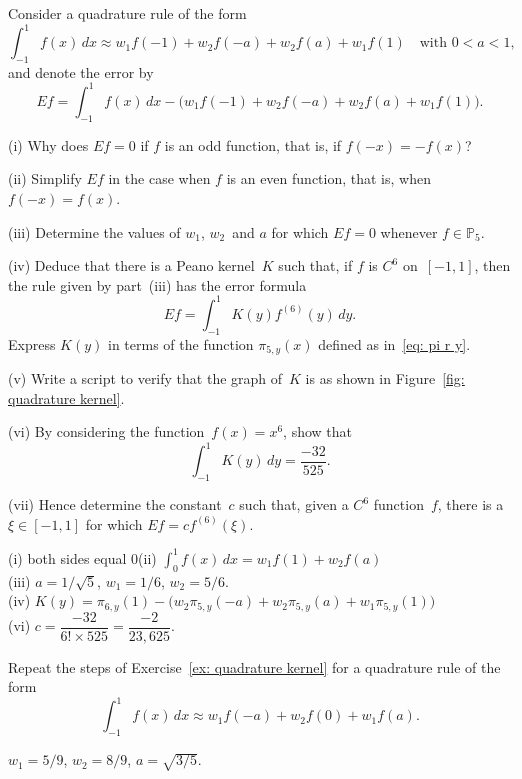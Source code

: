 \begin{Exercises}
\exercise\label{ex: quadrature kernel}
Consider a quadrature rule of the form
\[
\int_{-1}^1f(x)\,dx\approx w_1f(-1)+w_2f(-a)+w_2f(a)+w_1f(1)
\quad\text{with $0<a<1$,}
\]
and denote the error by
\[
Ef=\int_{-1}^1f(x)\,dx-\bigl(w_1f(-1)+w_2f(-a)+w_2f(a)+w_1f(1)\bigr).
\]
\begin{description}
\item{(i)} Why does $Ef=0$ if $f$ is an odd function, that is, if
$f(-x)=-f(x)$?
\item{(ii)} Simplify $Ef$ in the case when $f$ is an even function, that is, 
when $f(-x)=f(x)$. \item{(iii)}
Determine the values of $w_1$, $w_2$~and $a$ for which $Ef=0$ whenever
$f\in\mathbb{P}_5$.
\item{(iv)}
Deduce that there is a Peano kernel~$K$ such that, if $f$ is $C^6$ 
on~$[-1,1]$, then the rule given by part~(iii) has the error formula
\[
Ef=\int_{-1}^1K(y)f^{(6)}(y)\,dy.
\]
Express $K(y)$ in terms of the function $\pi_{5,y}(x)$ defined as 
in~\eqref{eq: pi r y}.
\item{(v)}
Write a script to verify that the graph of~$K$ is as shown in 
Figure~\ref{fig: quadrature kernel}.
\item{(vi)}
By considering the function~$f(x)=x^6$, show that 
\[
\int_{-1}^1K(y)\,dy=\frac{-32}{525}.
\]
\item{(vii)}
Hence determine the constant~$c$ such that, given a $C^6$ function~$f$,
there is a $\xi\in[-1,1]$ for which $Ef=cf^{(6)}(\xi)$.
\end{description}
\begin{ans}
(i) both sides equal $0$\quad (ii) $\int_0^1f(x)\,dx=w_1f(1)+w_2f(a)$\\
(iii) $a=1/\sqrt{5}$, $w_1=1/6$, $w_2=5/6$.\\
(iv) $K(y)=\pi_{6,y}(1)-\bigl(w_2\pi_{5,y}(-a)+w_2\pi_{5,y}(a)
+w_1\pi_{5,y}(1) \bigr)$\\
(vi) $c=\dfrac{-32}{6!\times525}=\dfrac{-2}{23,625}$.
\end{ans}

\exercise
Repeat the steps of Exercise~\ref{ex: quadrature kernel} for a quadrature rule
of the form
\[
\int_{-1}^1 f(x)\,dx\approx w_1f(-a)+w_2f(0)+w_1f(a).
\]
\begin{ans}
$w_1=5/9$, $w_2=8/9$, $a=\sqrt{3/5}$.
\end{ans}



\end{Exercises}
